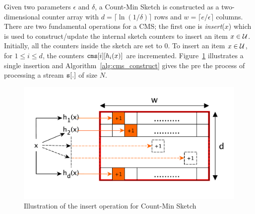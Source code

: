 \documentclass[10pt, conference, compsocconf]{IEEEtran}
\begin{document}
Given two parameters $\epsilon$ and $\delta$, a Count-Min Sketch is constructed as a two-dimensional counter array with 
$d = \lceil \ln(1/\delta) \rceil$ rows and $w = \lceil e/\epsilon \rceil$ columns. 
There are two fundamental operations for a CMS; the first one is {\em insert}($x$) which is used to construct/update 
the internal sketch counters to insert an item $x \in {\cal U}$. Initially, all the counters inside the sketch are set to $0$. 
To insert an item $x \in {\cal U}$, for $1 \leq i \leq d$, the counters ${\tt cms}[i][h_i(x)]$ are incremented. Figure~\ref{fig:cms_insert} illustrates a single insertion and Algorithm~\ref{alg:cms_construct} gives the pre the process of processing a stream ${\tt s}[.]$ of size $N$. 

 \begin{figure}[htbp]
\begin{center}
\includegraphics[width=0.90\linewidth]{cms.pdf}
\caption{Illustration of the insert operation for Count-Min Sketch}
\label{fig:cms_insert}
\end{center}
\end{figure}
 
\end{document}

